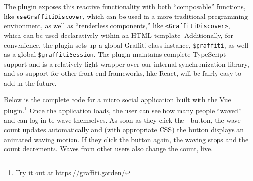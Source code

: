 


The plugin exposes this reactive functionality with both
``composable'' functions,
like \texttt{useGraffitiDiscover}, which can be used
in a more traditional programming environment, as well as
``renderless components,''
like \texttt{<GraffitiDiscover>},
which can be used declaratively within an HTML template.
Additionally, for convenience,
the plugin sets up a global Graffiti class instance, \texttt{\$graffiti},
as well as a global
\texttt{\$graffitiSession}.
The plugin maintains complete TypeScript support and
is a relatively light wrapper over our internal synchronization library,
and so support for other front-end frameworks, like React, will be
fairly easy to add in the future.

Below is the complete code for a micro social application built with
the Vue plugin.\footnote{
  Try it out at \url{https://graffiti.garden/}
}
Once the application loads, the user can see how many people ``waved''
and can log in to wave themselves.
As soon as they click the 👋 button, the wave count updates automatically and
(with appropriate CSS) the button displays an animated waving motion.
If they click the button again, the waving stops and the count decrements.
Waves from other users also change the count, live.

